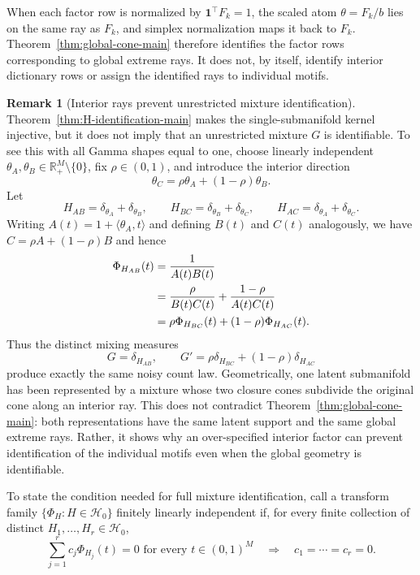 \documentclass[11pt]{article}
\newcommand{\R}{\mathbb{R}}
\newcommand{\one}{\mathbf{1}}
\theoremstyle{plain}
\theoremstyle{definition}
\newtheorem{remark}{Remark}
\begin{document}
When each factor row is normalized by $\one^\top F_k=1$, the scaled atom
$\theta=F_k/b$ lies on the same ray as $F_k$, and simplex normalization maps
it back to $F_k$.  Theorem~\ref{thm:global-cone-main} therefore identifies
the factor rows corresponding to global extreme rays.  It does not, by
itself, identify interior dictionary rows or assign the identified rays to
individual motifs.

\begin{remark}[Interior rays prevent unrestricted mixture identification]
\label{rem:interior-ray-main}
Theorem~\ref{thm:H-identification-main} makes the single-submanifold kernel
injective, but it does not imply that an unrestricted mixture $G$ is
identifiable.  To see this with all Gamma shapes equal to one, choose linearly
independent $\theta_A,\theta_B\in\R_+^M\setminus\{0\}$, fix
$\rho\in(0,1)$, and introduce the interior direction
\[
  \theta_C=\rho\theta_A+(1-\rho)\theta_B.
\]
Let
\[
  H_{AB}=\delta_{\theta_A}+\delta_{\theta_B},\qquad
  H_{BC}=\delta_{\theta_B}+\delta_{\theta_C},\qquad
  H_{AC}=\delta_{\theta_A}+\delta_{\theta_C}.
\]
Writing
$A(t)=1+\langle\theta_A,t\rangle$ and defining $B(t)$ and $C(t)$
analogously, we have $C=\rho A+(1-\rho)B$ and hence
\begin{align}
  \Phi_{H_{AB}}(t)
  &=\frac{1}{A(t)B(t)} \notag\\
  &=\frac{\rho}{B(t)C(t)}
    +\frac{1-\rho}{A(t)C(t)} \notag\\
  &=\rho\Phi_{H_{BC}}(t)
    +(1-\rho)\Phi_{H_{AC}}(t).
  \label{eq:interior-identity-main}
\end{align}
Thus the distinct mixing measures
\[
  G=\delta_{H_{AB}},
  \qquad
  G'=\rho\delta_{H_{BC}}+(1-\rho)\delta_{H_{AC}}
\]
produce exactly the same noisy count law.  Geometrically, one latent
submanifold has been represented by a mixture whose two closure cones
subdivide the original cone along an interior ray.  This does not contradict
Theorem~\ref{thm:global-cone-main}: both representations have the same latent
support and the same global extreme rays.  Rather, it shows why an
over-specified interior factor can prevent identification of the individual
motifs even when the global geometry is identifiable.
\end{remark}

To state the condition needed for full mixture identification, call a
transform family $\{\Phi_H:H\in\mathcal H_0\}$ finitely linearly independent
if, for every finite collection of distinct
$H_1,\ldots,H_r\in\mathcal H_0$,
\begin{equation}
  \sum_{j=1}^{r}c_j\Phi_{H_j}(t)=0
  \text{ for every }t\in(0,1)^M
  \quad\Longrightarrow\quad
  c_1=\cdots=c_r=0.
  \label{eq:finite-linear-independence-main}
\end{equation}
\end{document}
